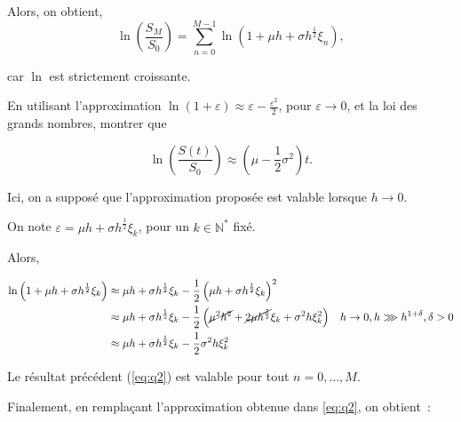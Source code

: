 \documentclass[answers, 10pt]{exam}
\begin{document}
\begin{questions}
\begin{solutionorbox}
		Alors, on obtient,
		\begin{equation}\label{eq:q2}
			\ln \left( \frac{S_M}{S_0} \right) = \sum_{n=0}^{M-1} \ln(1 + \mu h + \sigma h^{\frac{1}{2}} \xi_n)
			,
		\end{equation}

		car $\ln$ est strictement croissante.

	\end{solutionorbox}

	\question

	En utilisant l'approximation $\ln(1 + \varepsilon) \approx \varepsilon - \frac{\varepsilon^2}{2}$, pour $\varepsilon \to 0$, et la loi des grands nombres, montrer que

	\begin{equation*}
		\ln \left(  \frac{S(t)}{S_0} \right) \approx \left( \mu - \frac{1}{2} \sigma^2 \right)t.
	\end{equation*}

	Ici, on a supposé que l'approximation proposée est valable lorsque $h\to 0$.

	\begin{solutionorbox}
		On note $\varepsilon = \mu h + \sigma h ^{\frac{1}{2}} \xi_k$,
		pour un $k\in \mathbb{N}^*$ fixé.

		Alors,

		\begin{align}\label{eq:approx}
			\ln \left( 1 + \mu h + \sigma h^{\frac{1}{2}}\xi_k \right) &\approx \mu h + \sigma h^{\frac{1}{2}} \xi_k - \frac{1}{2} \left( \mu h + \sigma h^{\frac{1}{2}}\xi_k \right)^2\\
										   &\approx \mu h + \sigma h^{\frac{1}{2}} \xi_k - \frac{1}{2} \left( \cancel{\mu^2 h^2} + \cancel{2\mu h^{\frac{3}{2}}} \xi_k  + \sigma^2 h \xi_k^2 \right) & h\to 0, h\ggg h^{1 + \delta}, \delta > 0
\\
									      &\approx \mu h + \sigma h^{\frac{1}{2}} \xi_k - \frac{1}{2} \sigma^2 h \xi_k^2 	
		\end{align}

		Le résultat précédent (\cref{eq:q2}) est valable pour tout
		$n=0,\dots,M$.

		Finalement, en remplaçant l'approximation obtenue dans
		\cref{eq:q2}, on obtient~:


\end{solutionorbox}
\end{questions}
\end{document}

